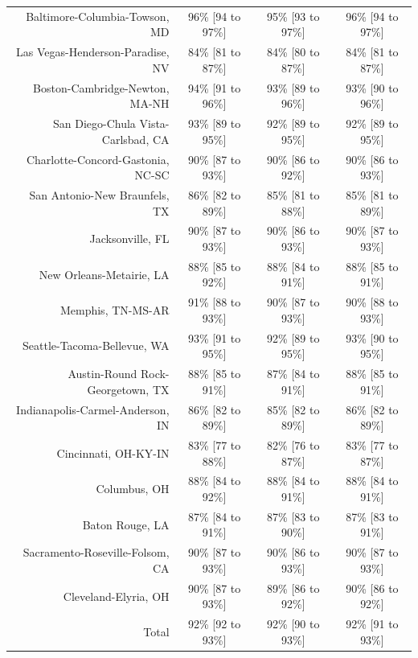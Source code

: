 \documentclass{article}
\begin{document}
\begin{table}[H]
\begin{tabular}{|r|c|c|c|}
		Baltimore-Columbia-Towson, MD & 96\% [94 to 97\%] & 95\% [93 to 97\%] & 96\% [94 to 97\%]\\
		Las Vegas-Henderson-Paradise, NV & 84\% [81 to 87\%] & 84\% [80 to 87\%] & 84\% [81 to 87\%]\\
		Boston-Cambridge-Newton, MA-NH & 94\% [91 to 96\%] & 93\% [89 to 96\%] & 93\% [90 to 96\%]\\
		San Diego-Chula Vista-Carlsbad, CA & 93\% [89 to 95\%] & 92\% [89 to 95\%] & 92\% [89 to 95\%]\\
		Charlotte-Concord-Gastonia, NC-SC & 90\% [87 to 93\%] & 90\% [86 to 92\%] & 90\% [86 to 93\%]\\
		San Antonio-New Braunfels, TX & 86\% [82 to 89\%] & 85\% [81 to 88\%] & 85\% [81 to 89\%]\\
		Jacksonville, FL & 90\% [87 to 93\%] & 90\% [86 to 93\%] & 90\% [87 to 93\%]\\
		New Orleans-Metairie, LA & 88\% [85 to 92\%] & 88\% [84 to 91\%] & 88\% [85 to 91\%]\\
		Memphis, TN-MS-AR & 91\% [88 to 93\%] & 90\% [87 to 93\%] & 90\% [88 to 93\%]\\
		Seattle-Tacoma-Bellevue, WA & 93\% [91 to 95\%] & 92\% [89 to 95\%] & 93\% [90 to 95\%]\\
		Austin-Round Rock-Georgetown, TX & 88\% [85 to 91\%] & 87\% [84 to 91\%] & 88\% [85 to 91\%]\\
		Indianapolis-Carmel-Anderson, IN & 86\% [82 to 89\%] & 85\% [82 to 89\%] & 86\% [82 to 89\%]\\
		Cincinnati, OH-KY-IN & 83\% [77 to 88\%] & 82\% [76 to 87\%] & 83\% [77 to 87\%]\\
		Columbus, OH & 88\% [84 to 92\%] & 88\% [84 to 91\%] & 88\% [84 to 91\%]\\
		Baton Rouge, LA & 87\% [84 to 91\%] & 87\% [83 to 90\%] & 87\% [83 to 91\%]\\
		Sacramento-Roseville-Folsom, CA & 90\% [87 to 93\%] & 90\% [86 to 93\%] & 90\% [87 to 93\%]\\
		Cleveland-Elyria, OH & 90\% [87 to 93\%] & 89\% [86 to 92\%] & 90\% [86 to 92\%]\\
		\hline
		Total & 92\% [92 to 93\%] & 92\% [90 to 93\%] & 92\% [91 to 93\%]\\
		\hline
	\end{tabular}
\end{table}
\end{document}
